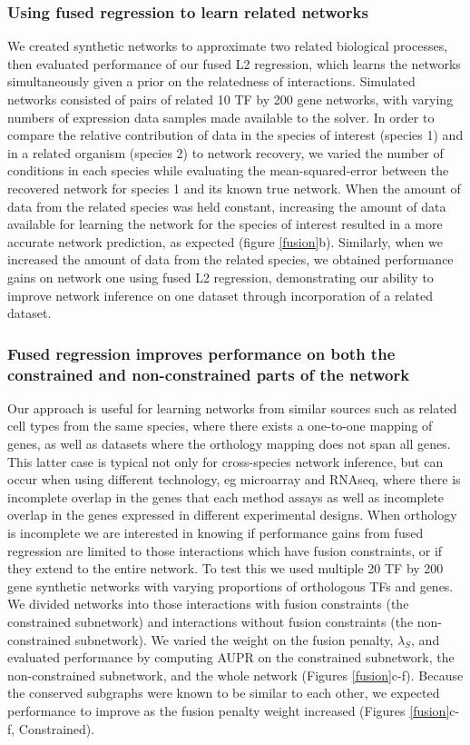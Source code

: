 \documentclass[11pt]{article}
\begin{document}
\subsubsection{Using fused regression to learn related networks}
We created synthetic networks to approximate two related biological processes, then evaluated performance of our fused L2 regression, which learns the networks simultaneously given a prior on the relatedness of interactions. Simulated networks consisted of pairs of related 10 TF by 200 gene networks, with varying numbers of expression data samples made available to the solver. In order to compare the relative contribution of data in the species of interest (species 1) and in a related organism (species 2) to network recovery, we varied the number of conditions in each species while evaluating the mean-squared-error between the recovered network for species 1 and its known true network. When the amount of data from the related species was held constant, increasing the amount of data available for learning the network for the species of interest resulted in a more accurate network prediction, as expected  (figure \ref{fusion}b). Similarly, when we increased the amount of data from the related species, we obtained performance gains on network one using fused L2 regression, demonstrating our ability to improve network inference on one dataset through incorporation of a related dataset.


\subsubsection{Fused regression improves performance on both the constrained and non-constrained parts of the network}
Our approach is useful for learning networks from similar sources such as related cell types from the same species, where there exists a one-to-one mapping of genes, as well as datasets where the orthology mapping does not span all genes. This latter case is typical not only for cross-species network inference, but can occur when using different technology, eg microarray and RNAseq, where there is incomplete overlap in the genes that each method assays as well as incomplete overlap in the genes expressed in different experimental designs. When orthology is incomplete we are interested in knowing if performance gains from fused regression are limited to those interactions which have fusion constraints, or if they extend to the entire network. To test this we used multiple 20 TF by 200 gene synthetic networks with varying proportions of orthologous TFs and genes. We divided networks into those interactions with fusion constraints (the constrained subnetwork) and interactions without fusion constraints (the non-constrained subnetwork). 
We varied the weight on the fusion penalty, $\lambda_S$, and evaluated performance by computing AUPR on the constrained subnetwork, the non-constrained subnetwork, and the whole network (Figures \ref{fusion}c-f). Because the conserved subgraphs were known to be similar to each other, we expected performance to improve as the fusion penalty weight increased (Figures \ref{fusion}c-f, Constrained).
\end{document}
